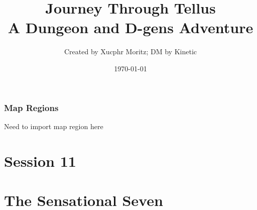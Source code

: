 \documentclass[letterpaper,twocolumn,openany,nodeprecatedcode]{dndbook}
\title{Journey Through Tellus \\
\large A Dungeon and D-gens Adventure}
\author{Created by Xucphr Moritz; DM by Kinetic}
\date{\today}
\begin{document}
\frontmatter

\maketitle

\tableofcontents

\mainmatter%



\section{Map Regions}

Need to import map region here






\part*{Session 11}


%

\part{The Sensational Seven}



%


%
\end{document}
